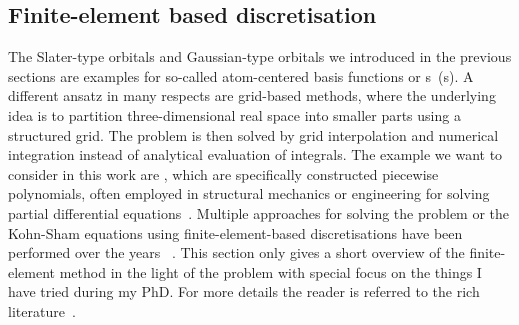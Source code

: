 \subsection{Finite-element based discretisation}
\label{sec:FE}
\newcommand{\Nquadc}{\ensuremath N_\text{quadc}}
\newcommand{\Ncell}{\ensuremath N_\text{cell}}

The Slater-type orbitals and Gaussian-type orbitals
we introduced in the previous sections
are examples for so-called atom-centered basis functions
or s~({\ACO}s).
A different ansatz in many respects
are grid-based methods,
where the underlying idea is to partition three-dimensional real space
into smaller parts using a structured grid.
The problem is then solved by grid interpolation and numerical integration
instead of analytical evaluation of integrals.
The example we want to consider in this work are ,
which are specifically constructed piecewise polynomials,
often employed in structural mechanics or engineering
for solving partial differential equations~\cite{Johnson1987}.
Multiple approaches for
solving the \HF problem or the Kohn-Sham equations
using finite-element-based discretisations
have been performed over the years%
~\cite{Tsuchida1995,Soler2002,Lehtovaara2009,Alizadegan2010,Avery2011PhD,Davydov2015,Lee2015,Boffi2016}.
This section only gives a short overview of the finite-element method
in the light of the \HF problem
with special focus on the things I have tried during my PhD.
For more details the reader is referred
to the rich literature~\cite{Johnson1987,Grossmann1992,Bangerth2003,Brenner2008}.

